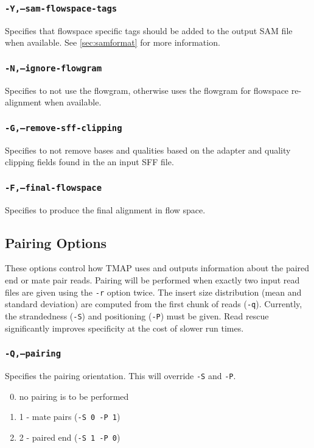 \documentclass[a4paper,12pt]{book}
\newcommand{\TT}[1]{{\tt #1}} %
\begin{document}
\subsubsection{\TT{-Y,--sam-flowspace-tags}}
Specifies that flowspace specific tags should be added to the output SAM file when available.
See \autoref{sec:samformat} for more information.

\subsubsection{\TT{-N,--ignore-flowgram}}
Specifies to not use the flowgram, otherwise uses the flowgram for flowspace re-alignment when available.

\subsubsection{\TT{-G,--remove-sff-clipping}}
Specifies to not remove bases and qualities based on the adapter and quality clipping fields found in the an input SFF file.

\subsubsection{\TT{-F,--final-flowspace}}
Specifies to produce the final alignment in flow space.

\subsection{Pairing Options}
These options control how TMAP uses and outputs information about the paired end or mate pair reads.
Pairing will be performed when exactly two input read files are given using the \TT{-r} option twice.
The insert size distribution (mean and standard deviation) are computed from the first chunk of reads (\TT{-q}).
Currently, the strandedness (\TT{-S}) and positioning (\TT{-P}) must be given.
Read rescue significantly improves specificity at the cost of slower run times.

\subsubsection{\TT{-Q,--pairing}}
Specifies the pairing orientation.
This will override \TT{-S} and \TT{-P}.
\begin{enumerate}
	\setcounter{enumi}{-1} %
	\item no pairing is to be performed
	\item 1 - mate pairs (\TT{-S 0 -P 1})
	\item 2 - paired end (\TT{-S 1 -P 0})
\end{enumerate}
\end{document}
